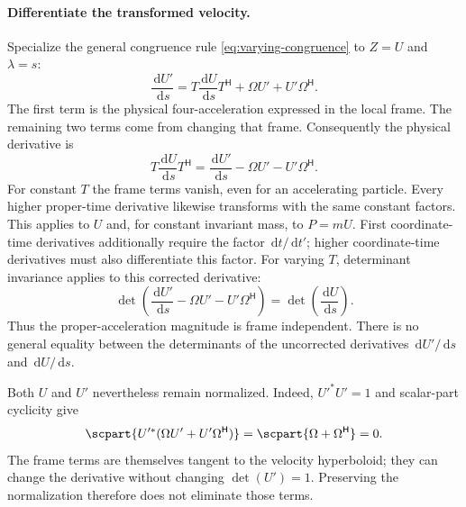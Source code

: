 \documentclass[11pt]{article}
\newcommand{\pv}[1]{{#1}}
\newcommand{\pvGreek}[1]{{#1}}
\newcommand{\pP}{\pv{P}}
\newcommand{\pT}{\pv{T}}
\newcommand{\pU}{\pv{U}}
\newcommand{\pZ}{\pv{Z}}
\newcommand{\pvOmega}{\pvGreek{\Omega}}
\numberwithin{equation}{section}
\newcommand{\dd}{\,\mathrm d}
\begin{document}
\paragraph{Differentiate the transformed velocity.}
Specialize the general congruence rule \eqref{eq:varying-congruence}
to $\pZ=\pU$ and $\lambda=s$:
\begin{equation}
 \frac{\dd\pU'}{\dd s}
 =\pT\frac{\dd\pU}{\dd s}\pT^{\mathsf H}
   +\pvOmega\pU'+\pU'\pvOmega^{\mathsf H}.
 \label{eq:local-velocity-derivative}
\end{equation}
The first term is the physical four-acceleration expressed in the
local frame. The remaining two terms come from changing that frame.
Consequently the physical derivative is
\begin{equation}
 \boxed{\pT\frac{\dd\pU}{\dd s}\pT^{\mathsf H}
 =\frac{\dd\pU'}{\dd s}-\pvOmega\pU'-\pU'\pvOmega^{\mathsf H}.}
 \label{eq:carried-acceleration}
\end{equation}
For constant $\pT$ the frame terms vanish, even for an accelerating
particle. Every higher proper-time derivative likewise transforms
with the same constant factors. This applies to $\pU$ and, for
constant invariant mass, to $\pP=m\pU$. First coordinate-time
derivatives additionally require the factor $\dd t/\dd t'$;
higher coordinate-time derivatives must also differentiate this factor.
For varying $\pT$, determinant invariance applies to
this corrected derivative:
\begin{equation}
 \boxed{\det\left(
 \frac{\dd\pU'}{\dd s}-\pvOmega\pU'-\pU'\pvOmega^{\mathsf H}
 \right)=\det\left(\frac{\dd\pU}{\dd s}\right).}
 \label{eq:carried-acceleration-invariant}
\end{equation}
Thus the proper-acceleration magnitude is frame independent.
There is no general equality between the determinants of the
uncorrected derivatives $\dd\pU'/\dd s$ and $\dd\pU/\dd s$.

Both $\pU$ and $\pU'$ nevertheless remain normalized.
Indeed, $\pU'^*\pU'=1$ and scalar-part cyclicity give
\[
 \scpart{\pU'^*(\pvOmega\pU'+\pU'\pvOmega^{\mathsf H})}
 =\scpart{\pvOmega+\pvOmega^{\mathsf H}}=0.
\]
The frame terms are themselves tangent to the velocity hyperboloid;
they can change the derivative without changing $\det(\pU')=1$.
Preserving the normalization therefore does not eliminate those terms.
\end{document}
